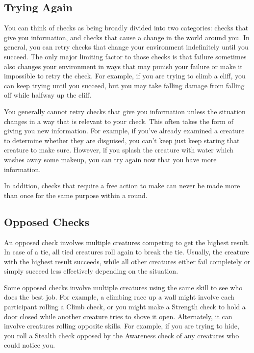     \subsection{Trying Again}
        You can think of checks as being broadly divided into two categories: checks that give you information, and checks that cause a change in the world around you.
        In general, you can retry checks that change your environment indefinitely until you succeed.
        The only major limiting factor to those checks is that failure sometimes also changes your environment in ways that may punish your failure or make it impossible to retry the check.
        For example, if you are trying to climb a cliff, you can keep trying until you succeed, but you may take falling damage from falling off while halfway up the cliff.

        You generally cannot retry checks that give you information unless the situation changes in a way that is relevant to your check.
        This often takes the form of giving you new information.
        For example, if you've already examined a creature to determine whether they are disguised, you can't keep just keep staring that creature to make sure.
        However, if you splash the creature with water which washes away some makeup, you can try again now that you have more information.

        In addition, checks that require a free action to make can never be made more than once for the same purpose within a round.

    \subsection{Opposed Checks}
        An opposed check involves multiple creatures competing to get the highest result.
        In case of a tie, all tied creatures roll again to break the tie.
        Usually, the creature with the highest result succeeds, while all other creatures either fail completely or simply succeed less effectively depending on the situation.

        Some opposed checks involve multiple creatures using the same skill to see who does the best job.
        For example, a climbing race up a wall might involve each participant rolling a Climb check, or you might make a Strength check to hold a door closed while another creature tries to shove it open.
        Alternately, it can involve creatures rolling opposite skills.
        For example, if you are trying to hide, you roll a Stealth check opposed by the Awareness check of any creatures who could notice you.

